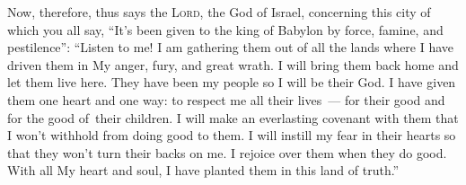 
\begin{inparaenum}
    
    
    
     Now, therefore, thus says the \textsc{Lord}, the God of Israel, concerning this city of which you all say, ``It's been given to the king of Babylon by force, famine, and pestilence'':%
     ``Listen to me! I am gathering them out of all the lands where I have driven them in My anger, fury, and great wrath. I will bring them back home and let them live here.%
     They have been my people so I will be their God.%
     I have given them one heart and one way: to respect me all their lives~--- for their good and for the good of\understood\ their children.%
     I will make an everlasting covenant with them that I won't withhold from doing good to them. I will instill my fear in their hearts so that they won't turn their backs on me.%
     I rejoice over them when they do good. With all My heart and soul, I have planted them in this land of truth.''%
    
\end{inparaenum}
